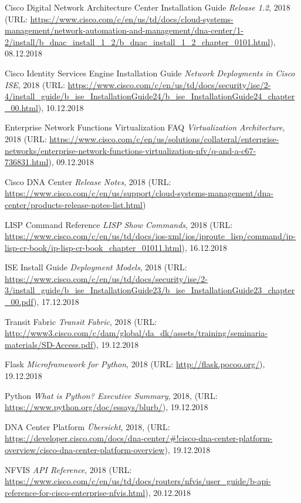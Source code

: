 \begin{thebibliography}{}
	 Cisco Digital Network Architecture Center Installation Guide \textit{Release 1.2}, 2018 (URL: \url{https://www.cisco.com/c/en/us/td/docs/cloud-systems-management/network-automation-and-management/dna-center/1-2/install/b_dnac_install_1_2/b_dnac_install_1_2_chapter_0101.html}), 08.12.2018
	
	 Cisco Identity Services Engine Installation Guide \textit{Network Deployments in Cisco ISE}, 2018 (URL: \url{https://www.cisco.com/c/en/us/td/docs/security/ise/2-4/install_guide/b_ise_InstallationGuide24/b_ise_InstallationGuide24_chapter_00.html}), 10.12.2018

	 Enterprise Network Functions Virtualization FAQ \textit{Virtualization Architecture}, 2018 (URL: \url{https://www.cisco.com/c/en/us/solutions/collateral/enterprise-networks/enterprise-network-functions-virtualization-nfv/q-and-a-c67-736831.html}), 09.12.2018
	
	 Cisco DNA Center \textit{Release Notes}, 2018 (URL: \url{https://www.cisco.com/c/en/us/support/cloud-systems-management/dna-center/products-release-notes-list.html})
	
	 LISP Command Reference \textit{LISP Show Commands}, 2018 (URL: \url{https://www.cisco.com/c/en/us/td/docs/ios-xml/ios/iproute_lisp/command/ip-lisp-cr-book/ip-lisp-cr-book_chapter_01011.html}), 16.12.2018
	
	 ISE Install Guide \textit{Deployment Models}, 2018 (URL: \url{https://www.cisco.com/c/en/us/td/docs/security/ise/2-3/install_guide/b_ise_InstallationGuide23/b_ise_InstallationGuide23_chapter_00.pdf}), 17.12.2018	
	
	 Transit Fabric \textit{Transit Fabric}, 2018 (URL: \url{http://www3.cisco.com/c/dam/global/da_dk/assets/training/seminaria-materials/SD-Access.pdf}), 19.12.2018	
	
	 Flask \textit{Microframework for Python}, 2018 (URL: \url{http://flask.pocoo.org/}), 19.12.2018
	
	 Python \textit{What is Python? Executive Summary}, 2018, (URL: \url{https://www.python.org/doc/essays/blurb/}), 19.12.2018
	
	 DNA Center Platform \textit{Übersicht}, 2018, (URL: \url{https://developer.cisco.com/docs/dna-center/#!cisco-dna-center-platform-overview/cisco-dna-center-platform-overview}), 19.12.2018
	
	 NFVIS \textit{API Reference}, 2018 (URL: \url{https://www.cisco.com/c/en/us/td/docs/routers/nfvis/user_guide/b-api-reference-for-cisco-enterprise-nfvis.html}), 20.12.2018
	
\end{thebibliography}
